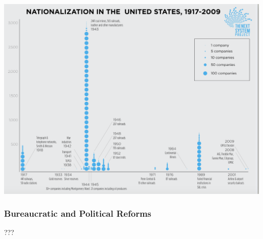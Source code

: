 \documentclass[aspectratio=169]{beamer}
\theoremstyle{principle}
\begin{document}
\begin{frame}
    \begin{center}
     \includegraphics[scale=0.3]{nationalization.png}
     \end{center}
\end{frame}


\begin{frame}
\frametitle{Bureaucratic and Political Reforms}
\begin{center}
\Huge ???
\end{center}
\end{frame}


%
%
\end{document}
